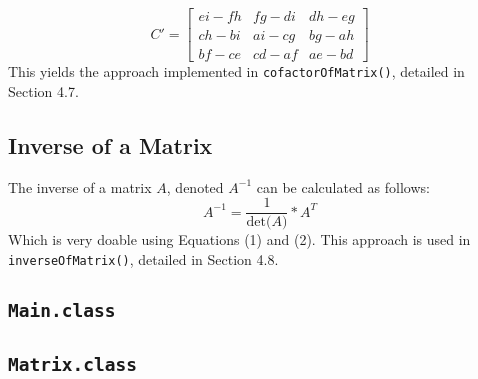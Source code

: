 \documentclass[12pt]{article}
\begin{document}
\begin{equation}
C' =
    \begin{bmatrix}
    e i - f h & f g - d i & d h - e g \\
    c h - b i & a i - c g & b g - a h \\
    b f - c e & c d - a f & a e - b d
\end{bmatrix}
\end{equation}
This yields the approach implemented in \texttt{cofactorOfMatrix()}, detailed in Section 4.7.

\subsection{Inverse of a Matrix}
The inverse of a matrix $A$, denoted $A^{-1}$ can be calculated as follows:
\begin{equation}
    A^{-1} = \frac{1}{\text{det($A$)}} * A^T
\end{equation}
Which is very doable using Equations (1) and (2). This approach is used in \texttt{inverseOfMatrix()}, detailed in Section 4.8.



\newpage %



\begin{center}
\section{\texttt{Main.class}}
\end{center}



\newpage %



\begin{center}
\section{\texttt{Matrix.class}}
\end{center}
\end{document}
